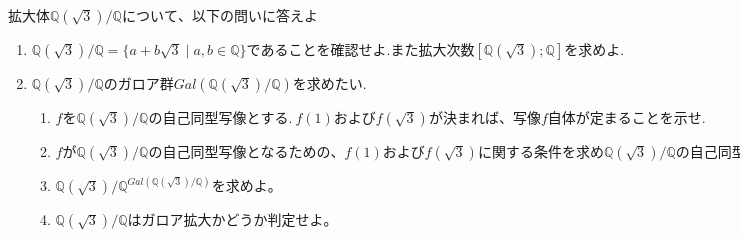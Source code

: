 \documentclass[dvipdfmx]{jsarticle}
\begin{document}
\begin{tcolorbox}[colframe=black!50,colback=white,colbacktitle=black!50,coltitle=white,fonttitle=\bfseries\sffamily,title=問題１]
$拡大体\mathbb{Q}(\sqrt{3}) / \mathbb{Q}について、以下の問いに答えよ$
\begin{enumerate}
  \item $\mathbb{Q}(\sqrt{3}) / \mathbb{Q} = \{a+b\sqrt{3} \mid a,b \in \mathbb{Q} \}であることを確認せよ.また拡大次数[\mathbb{Q}(\sqrt{3}) ; \mathbb{Q}]を求めよ.$
  \item $\mathbb{Q}(\sqrt{3}) / \mathbb{Q}のガロア群Gal(\mathbb{Q}(\sqrt{3}) / \mathbb{Q})を求めたい.$
  \begin{enumerate}
    \item $f を \mathbb{Q}(\sqrt{3}) / \mathbb{Q}の自己同型写像とする. \ f(1)およびf(\sqrt{3})が決まれば、写像f自体が定まることを示せ.$
    \item $fが\mathbb{Q}(\sqrt{3}) / \mathbb{Q}の自己同型写像となるための、f(1)およびf(\sqrt{3})に関する条件を求め\mathbb{Q}(\sqrt{3}) / \mathbb{Q}の自己同型写像を列挙せよ。$
    \item $\mathbb{Q}(\sqrt{3}) / \mathbb{Q}^{Gal(\mathbb{Q}(\sqrt{3}) / \mathbb{Q})}を求めよ。$
    \item $\mathbb{Q}(\sqrt{3}) / \mathbb{Q}はガロア拡大かどうか判定せよ。$
  \end{enumerate}
\end{enumerate}
\end{tcolorbox}
\end{document}

